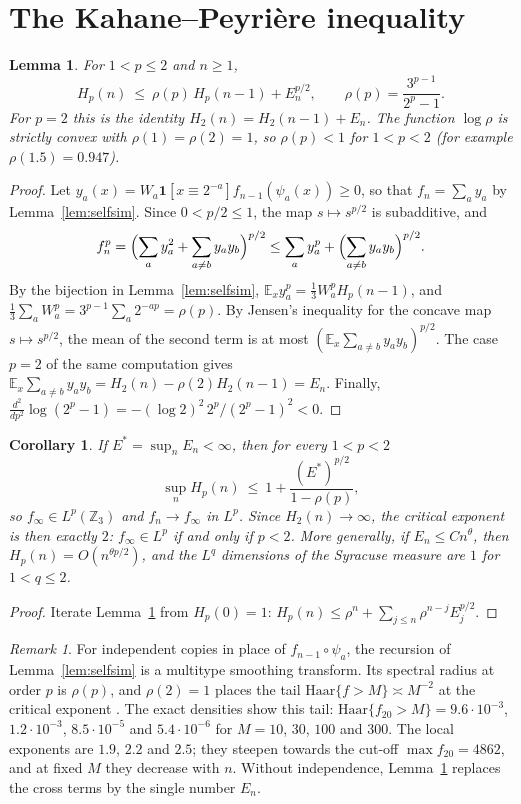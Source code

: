 \documentclass[11pt]{article}
\newtheorem{lemma}[theorem]{Lemma}
\newtheorem{corollary}[theorem]{Corollary}
\theoremstyle{remark}
\newtheorem{remark}[theorem]{Remark}
\newcommand{\Z}{\mathbb Z}
\newcommand{\E}{\mathbb E}
\begin{document}
\section{The Kahane--Peyri\`ere inequality}
\begin{lemma}\label{lem:kp}
For $1<p\le2$ and $n\ge1$,
\[
 H_p(n)\ \le\ \rho(p)\,H_p(n-1)+E_n^{p/2},\qquad \rho(p)=\frac{3^{p-1}}{2^p-1}.
\]
For $p=2$ this is the identity $H_2(n)=H_2(n-1)+E_n$. The function $\log\rho$ is strictly convex with $\rho(1)=\rho(2)=1$, so $\rho(p)<1$ for $1<p<2$ (for example $\rho(1.5)=0.947$).
\end{lemma}

\begin{proof}
Let $y_a(x)=W_a\mathbf 1[x\equiv2^{-a}]f_{n-1}(\psi_a(x))\ge0$, so that $f_n=\sum_ay_a$ by Lemma~\ref{lem:selfsim}. Since $0<p/2\le1$, the map $s\mapsto s^{p/2}$ is subadditive, and
\[
 f_n^p=\Bigl(\sum_ay_a^2+\sum_{a\ne b}y_ay_b\Bigr)^{p/2}\le\sum_ay_a^p+\Bigl(\sum_{a\ne b}y_ay_b\Bigr)^{p/2}.
\]
By the bijection in Lemma~\ref{lem:selfsim}, $\E_xy_a^p=\frac13W_a^pH_p(n-1)$, and $\frac13\sum_aW_a^p=3^{p-1}\sum_a2^{-ap}=\rho(p)$. By Jensen's inequality for the concave map $s\mapsto s^{p/2}$, the mean of the second term is at most $(\E_x\sum_{a\ne b}y_ay_b)^{p/2}$. The case $p=2$ of the same computation gives $\E_x\sum_{a\ne b}y_ay_b=H_2(n)-\rho(2)H_2(n-1)=E_n$. Finally, $\frac{d^2}{dp^2}\log(2^p-1)=-(\log2)^2\,2^p/(2^p-1)^2<0$.
\end{proof}

\begin{corollary}\label{cor:lp}
If $E^*=\sup_nE_n<\infty$, then for every $1<p<2$
\[
 \sup_nH_p(n)\ \le\ 1+\frac{(E^*)^{p/2}}{1-\rho(p)},
\]
so $f_\infty\in L^p(\Z_3)$ and $f_n\to f_\infty$ in $L^p$. Since $H_2(n)\to\infty$, the critical exponent is then exactly $2$: $f_\infty\in L^p$ if and only if $p<2$. More generally, if $E_n\le Cn^\theta$, then $H_p(n)=O(n^{\theta p/2})$, and the $L^q$ dimensions of the Syracuse measure are $1$ for $1<q\le2$.
\end{corollary}

\begin{proof}
Iterate Lemma~\ref{lem:kp} from $H_p(0)=1$: $H_p(n)\le\rho^n+\sum_{j\le n}\rho^{n-j}E_j^{p/2}$.
\end{proof}

\begin{remark}
For independent copies in place of $f_{n-1}\circ\psi_a$, the recursion of Lemma~\ref{lem:selfsim} is a multitype smoothing transform. Its spectral radius at order $p$ is $\rho(p)$, and $\rho(2)=1$ places the tail $\mathrm{Haar}\{f>M\}\asymp M^{-2}$ at the critical exponent \cite{DL,KP}. The exact densities show this tail: $\mathrm{Haar}\{f_{20}>M\}=9.6\cdot10^{-3}$, $1.2\cdot10^{-3}$, $8.5\cdot10^{-5}$ and $5.4\cdot10^{-6}$ for $M=10$, $30$, $100$ and $300$. The local exponents are $1.9$, $2.2$ and $2.5$; they steepen towards the cut-off $\max f_{20}=4862$, and at fixed $M$ they decrease with $n$. Without independence, Lemma~\ref{lem:kp} replaces the cross terms by the single number $E_n$.
\end{remark}
\end{document}
